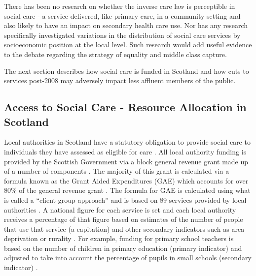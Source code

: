 \documentclass[12pt,]{report}
\begin{document}
There has been no research on whether the inverse care law is
perceptible in social care - a service delivered, like primary care, in
a community setting and also likely to have an impact on secondary
health care use. Nor has any research specifically investigated
variations in the distribution of social care services by socioeconomic
position at the local level. Such research would add useful evidence to
the debate regarding the strategy of equality and middle class capture.

The next section describes how social care is funded in Scotland and how
cuts to services post-2008 may adversely impact less affluent members of
the public.

\subsection{Access to Social Care - Resource Allocation in Scotland}\label{subsubsec:resources-scot}

Local authorities in Scotland have a statutory obligation to provide
social care to individuals they have assessed as eligible for care
\citep{RN449}. All local authority funding is provided by the Scottish
Government via a block general revenue grant made up of a number of
components \citep{RN448, RN445}. The majority of this grant is
calculated via a formula known as the Grant Aided Expenditures (GAE)
which accounts for over 80\% of the general revenue grant \citep{RN450}.
The formula for GAE is calculated using what is called a ``client group
approach'' and is based on 89 services provided by local authorities
\citep{RN450}. A national figure for each service is set and each local
authority receives a percentage of that figure based on estimates of the
number of people that use that service (a capitation) and other
secondary indicators such as area deprivation or rurality
\citep{RN450, RN444}. For example, funding for primary school teachers
is based on the number of children in primary education (primary
indicator) and adjusted to take into account the percentage of pupils in
small schools (secondary indicator) \citep{RN450}.
\end{document}
